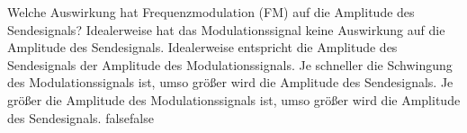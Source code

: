     {Welche Auswirkung hat Frequenzmodulation (FM) auf die Amplitude des Sendesignals?}
    {Idealerweise hat das Modulationssignal keine Auswirkung auf die Amplitude des Sendesignals.}
    {Idealerweise entspricht die Amplitude des Sendesignals der Amplitude des Modulationssignals.}
    {Je schneller die Schwingung des Modulationssignals ist, umso größer wird die Amplitude des Sendesignals.}
    {Je größer die Amplitude des Modulationssignals ist, umso größer wird die Amplitude des Sendesignals.}
    {false}{false}